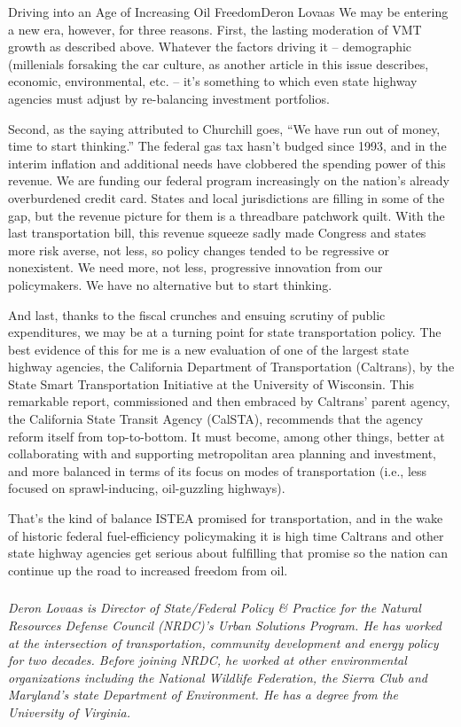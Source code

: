 \documentclass{papertex}
\begin{document}
\begin{news}{2}{Driving into an Age of Increasing Oil Freedom}{Deron Lovaas}{}{}
We may be entering a new era, however, for three reasons. First, the lasting 
moderation of VMT growth as described above. Whatever the factors driving it – 
demographic (millenials forsaking the car culture, as another article in this 
issue describes, economic, environmental, etc. – it’s something to which even 
state highway agencies must adjust by re-balancing investment portfolios.

Second, as the saying attributed to Churchill goes, “We have run out of money, 
time to start thinking.” The federal gas tax hasn’t budged since 1993, and in 
the interim inflation and additional needs have clobbered the spending power 
of this revenue. We are funding our federal program increasingly on the 
nation’s already overburdened credit card. States and local jurisdictions are 
filling in some of the gap, but the revenue picture for them is a threadbare 
patchwork quilt. With the last transportation bill, this revenue squeeze sadly 
made Congress and states more risk averse, not less, so policy changes tended 
to be regressive or nonexistent. We need more, not less, progressive 
innovation from our policymakers. We have no alternative but to start 
thinking.

And last, thanks to the fiscal crunches and ensuing scrutiny of public 
expenditures, we may be at a turning point for state transportation policy. 
The best evidence of this for me is a new evaluation of one of the largest 
state highway agencies, the California Department of Transportation 
(Caltrans), by the State Smart Transportation Initiative at the University of 
Wisconsin. This remarkable report, commissioned and then embraced by Caltrans’ 
parent agency, the California State Transit Agency (CalSTA), recommends that 
the agency reform itself from top-to-bottom. It must become, among other 
things, better at collaborating with and supporting metropolitan area planning 
and investment, and more balanced in terms of its focus on modes of 
transportation (i.e., less focused on sprawl-inducing, oil-guzzling highways).

That’s the kind of balance ISTEA promised for transportation, and in the wake 
of historic federal fuel-efficiency policymaking it is high time Caltrans and 
other state highway agencies get serious about fulfilling that promise so the 
nation can continue up the road to increased freedom from oil.


\subsubsection*{}

\emph{Deron Lovaas is Director of State/Federal Policy \& Practice for the 
Natural Resources Defense Council (NRDC)’s Urban Solutions Program. He has 
worked at the intersection of transportation, community development and energy 
policy for two decades. Before joining NRDC, he worked at other environmental 
organizations including the National Wildlife Federation, the Sierra Club and 
Maryland’s state Department of Environment. He has a degree from the University 
of Virginia.}

\end{news}
\end{document}
